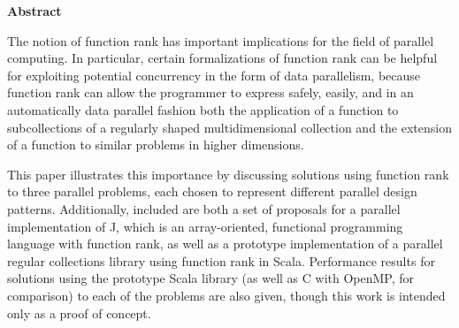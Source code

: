 \begin{center}

\bigskip

\begin{Large}
\textbf{\theTitle}
\end{Large}

\bigskip

\begin{large}
\theAuthor
\end{large}

\bigskip
\bigskip

\textbf{Abstract}

\end{center}

\noindent
The notion of function rank has important implications for the field of parallel computing.
In particular, certain formalizations of function rank can be helpful 
for exploiting potential concurrency in the form of data parallelism, 
because function rank can allow the programmer to express safely, easily, and in an automatically data parallel fashion  
both the application of a function to subcollections of a regularly shaped multidimensional collection and 
the extension of a function to similar problems in higher dimensions.

This paper illustrates this importance 
by discussing solutions using function rank to three parallel problems, 
each chosen to represent different parallel design patterns. 
Additionally, included are both a set of proposals for a parallel implementation of J, 
which is an array-oriented, functional programming language with function rank, 
as well as a prototype implementation of a parallel regular collections library using function rank in Scala. 
Performance results for solutions using the prototype Scala library (as well as C with OpenMP, for comparison) 
to each of the problems are also given, though this work is intended only as a proof of concept.

